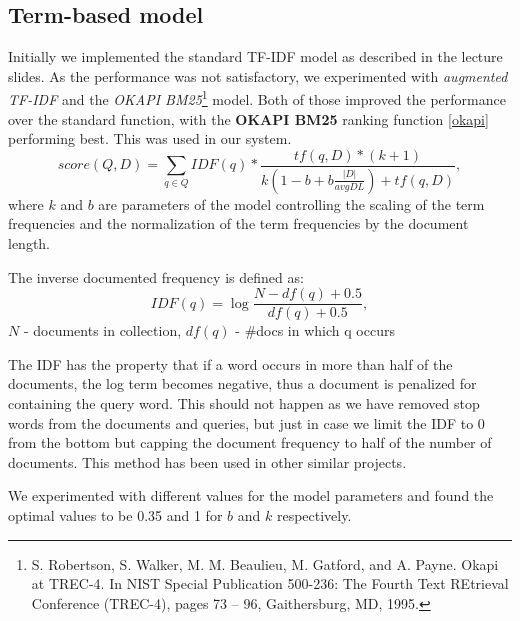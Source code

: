 \documentclass[a4paper, 11pt]{article}
\begin{document}
\subsection{Term-based model}
Initially we implemented the standard TF-IDF model as described in the lecture slides. As the performance was not satisfactory, we experimented with \textit{augmented TF-IDF} and the \textit{OKAPI BM25}\footnote{S. Robertson, S. Walker, M. M. Beaulieu, M. Gatford, and A. Payne. Okapi at
TREC-4. In NIST Special Publication 500-236: The Fourth Text REtrieval Conference
(TREC-4), pages 73 – 96, Gaithersburg, MD, 1995.} model. Both of those improved the performance over the standard function, with the \textbf{OKAPI BM25} ranking function \ref{okapi} performing best. This was used in our system.
\begin{equation}
score(Q,D) = \sum_{q\in Q} IDF(q)*\frac{tf(q,D)*(k+1)}{k(1-b+b\frac{|D|}{avgDL})+tf(q,D)},
\label{okapi}
\end{equation}where $k$ and $b$ are parameters of the model controlling the scaling of the term frequencies and the normalization of the term frequencies by the document length.

The inverse documented frequency is defined as:
\begin{equation}
IDF(q) = \log{\frac{N - df(q) + 0.5}{df(q) + 0.5}},
\end{equation}
$N$ - documents in collection, $df(q)$ - \#docs in which q occurs

The IDF has the property that if a word occurs in more than half of the documents, the log term becomes negative, thus a document is penalized for containing the query word. This should not happen as we have removed stop words from the documents and queries, but just in case we limit the IDF to 0 from the bottom but capping the document frequency to half of the number of documents. This method has been used in other similar projects.

We experimented with different values for the model parameters and found the optimal values to be 0.35 and 1 for $b$ and $k$ respectively.
\end{document}
